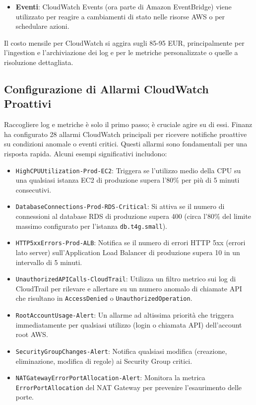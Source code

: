 \begin{itemize}
\begin{itemize}
            \item \textbf{Eventi}: CloudWatch Events (ora parte di Amazon EventBridge) viene utilizzato per reagire a cambiamenti di stato nelle risorse AWS o per schedulare azioni.
        \end{itemize}
        Il costo mensile per CloudWatch si aggira sugli 85-95 EUR, principalmente per l'ingestion e l'archiviazione dei log e per le metriche personalizzate o quelle a risoluzione dettagliata.
\end{itemize}

\subsection{Configurazione di Allarmi CloudWatch Proattivi}
\label{subsec:cloudwatch-alarms_cap2}
Raccogliere log e metriche è solo il primo passo; è cruciale agire su di essi. Finanz ha configurato 28 allarmi CloudWatch principali per ricevere notifiche proattive su condizioni anomale o eventi critici. Questi allarmi sono fondamentali per una risposta rapida. Alcuni esempi significativi includono:
\begin{itemize}
    \item \texttt{HighCPUUtilization-Prod-EC2}: Triggera se l'utilizzo medio della CPU su una qualsiasi istanza EC2 di produzione supera l'80\% per più di 5 minuti consecutivi.
    \item \texttt{DatabaseConnections-Prod-RDS-Critical}: Si attiva se il numero di connessioni al database RDS di produzione supera 400 (circa l'80\% del limite massimo configurato per l'istanza \texttt{db.t4g.small}).
    \item \texttt{HTTP5xxErrors-Prod-ALB}: Notifica se il numero di errori HTTP 5xx (errori lato server) sull'Application Load Balancer di produzione supera 10 in un intervallo di 5 minuti.
    \item \texttt{UnauthorizedAPICalls-CloudTrail}: Utilizza un filtro metrico sui log di CloudTrail per rilevare e allertare su un numero anomalo di chiamate API che risultano in \texttt{AccessDenied} o \texttt{UnauthorizedOperation}.
    \item \texttt{RootAccountUsage-Alert}: Un allarme ad altissima priorità che triggera immediatamente per qualsiasi utilizzo (login o chiamata API) dell'account root AWS.
    \item \texttt{SecurityGroupChanges-Alert}: Notifica qualsiasi modifica (creazione, eliminazione, modifica di regole) ai Security Group critici.
    \item \texttt{NATGatewayErrorPortAllocation-Alert}: Monitora la metrica \texttt{ErrorPortAllocation} del NAT Gateway per prevenire l'esaurimento delle porte.
\end{itemize}
